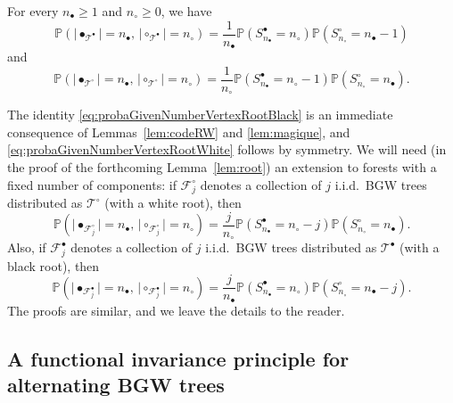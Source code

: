 \documentclass[AHL,XML,longabstracts,Unicode]{cedram}
\providecommand{\abs}[1]{\lvert#1\rvert}
\def\nc{n_{\circ}}
\def\nb{n_{\bullet}}
\def \Tsb{\Ts^{\bullet}}
\def \Tsc{\Ts^{\circ}}
\def\Ts{\mathscr{T}}
\renewcommand\Pr[1]{\mathbb{P}\left(#1\right)}
\begin{document}
\begin{corollary}
  \label{cor:probaGivenNumber}
For every $\nb \geq 1$ and $\nc \geq 0$, we have
\begin{equation}
\Pr{
\abs{\bullet_{\Tsb}}=n_\bullet,\, \abs{\circ_{\Tsb}}=n_\circ } = \frac{1}{n_\bullet} \Pr{S^{\bullet}_{n_\bullet}=n_\circ} \Pr{S^{\circ}_{n_\circ}=n_\bullet-1}
\label{eq:probaGivenNumberVertexRootBlack}
\end{equation}
and
\begin{equation}
\Pr{
\abs{\bullet_{\Tsc}}=n_\bullet,\, \abs{\circ_{\Tsc}}=n_\circ } =
\frac{1}{n_\circ} \Pr{S^{\bullet}_{n_\bullet}=n_\circ-1} \Pr{S^{\circ}_{n_\circ}=n_\bullet}.
\label{eq:probaGivenNumberVertexRootWhite}
\end{equation}
\end{corollary}

The identity \eqref{eq:probaGivenNumberVertexRootBlack} is an immediate consequence of  Lemmas~\ref{lem:codeRW} and \ref{lem:magique},  and \eqref{eq:probaGivenNumberVertexRootWhite}  follows by symmetry. We will need (in the proof of the forthcoming Lemma~\ref{lem:root}) an extension to forests with a fixed number of components: if $ \mathscr{F}^{\circ}_{j}$ denotes a collection of $j$ i.i.d.\ BGW trees distributed as  $ \Tsc$ (with a white root), then
\begin{equation}
\label{eq:forestc}
\Pr{\abs{\bullet_{\mathscr{F}^{\circ}_{j}}}=n_\bullet,\, \abs{\circ_{\mathscr{F}^{\circ}_{j}}}=n_\circ } =
\frac{j}{n_\circ} \Pr{S^{\bullet}_{n_\bullet}=n_\circ-j} \Pr{S^{\circ}_{n_\circ}=n_\bullet}.
\end{equation}
Also,  if $ \mathscr{F}^{\bullet}_{j}$ denotes a collection of $j$ i.i.d.\ BGW trees distributed as  $ \Tsb$ (with a black root), then
\begin{equation}
\label{eq:forestb}
\Pr{\abs{\bullet_{\mathscr{F}^{\bullet}_{j}}}=n_\bullet,\, \abs{\circ_{\mathscr{F}^{\bullet}_{j}}}=n_\circ } =
\frac{j}{n_\bullet} \Pr{S^{\bullet}_{n_\bullet}=n_\circ} \Pr{S^{\circ}_{n_\circ}=n_\bullet-j}.
\end{equation}
The proofs are similar, and we leave the details to the reader.

\subsection{A functional invariance principle for alternating BGW trees}
\label{ss:inv}
\end{document}

